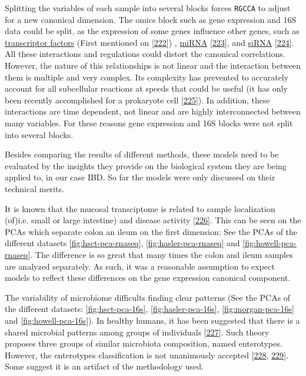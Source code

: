 \documentclass[
  12pt,
  a4paper,
  twoside,
  openright]{book}
\begin{document}
Splitting the variables of each sample into several blocks forces \texttt{RGCCA} to adjust for a new canonical dimension.
The omics block such as gene expression and 16S data could be split, as the expression of some genes influence other genes, such as \href{https://en.wikipedia.org/wiki/Transcription_factor}{transcriptor factors} (First mentioned on {[}\protect\hyperlink{ref-stillman1984}{222}{]}) , \href{https://en.wikipedia.org/wiki/MicroRNA}{miRNA} {[}\protect\hyperlink{ref-lee1993}{223}{]}, and \href{https://en.wikipedia.org/wiki/Small_interfering_RNA}{siRNA} {[}\protect\hyperlink{ref-hamilton1999}{224}{]}.
All these interactions and regulations could distort the canonical correlations.
However, the nature of this relationships is not linear and the interaction between them is multiple and very complex.
Its complexity has prevented to accurately account for all subcellular reactions at speeds that could be useful (it has only been recently accomplished for a prokaryote cell {[}\protect\hyperlink{ref-thornburg2022}{225}{]}).
In addition, these interactions are time dependent, not linear and are highly interconnected between many variables.
For these reasons gene expression and 16S blocks were not split into several blocks.

Besides comparing the results of different methods, these models need to be evaluated by the insights they provide on the biological system they are being applied to, in our case IBD.
So far the models were only discussed on their technical merits.

It is known that the mucosal transciptome is related to sample localization (of)i.e.
small or large intestine) and disease activity {[}\protect\hyperlink{ref-criss2021}{226}{]}.
This can be seen on the PCAs which separate colon an ileum on the first dimension: See the PCAs of the different datasets \ref{fig:hsct-pca-rnaseq}, \ref{fig:hasler-pca-rnaseq} and \ref{fig:howell-pca-rnaseq}.
The difference is so great that many times the colon and ileum samples are analyzed separately.
As such, it was a reasonable assumption to expect models to reflect these differences on the gene expression canonical component.

The variability of microbiome difficults finding clear patterns (See the PCAs of the different datasets: \ref{fig:hsct-pca-16s}, \ref{fig:hasler-pca-16s}, \ref{fig:morgan-pca-16s} and \ref{fig:howell-pca-16s}).
In healthy humans, it has been suggested that there is a shared microbial patterns among groups of individuals {[}\protect\hyperlink{ref-arumugam2011}{227}{]}. Such theory proposes three groups of similar microbiota composition, named enterotypes. However, the enterotypes classification is not unanimously accepted {[}\protect\hyperlink{ref-koren2013}{228}, \protect\hyperlink{ref-cheng2019}{229}{]}.
Some suggest it is an artifact of the methodology used.
\end{document}
